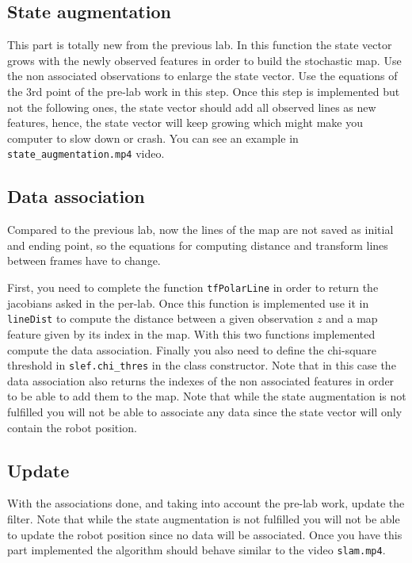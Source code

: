 \documentclass[a4paper,10pt]{article}
\begin{document}
\subsection{State augmentation}
This part is totally new from the previous lab. In this function the state vector grows with the newly observed features in order to build the stochastic map. Use the non associated observations to enlarge the state vector. Use the equations of the 3rd point of the pre-lab work in this step. Once this step is implemented but not the following ones, the state vector should add all observed lines as new features, hence, the state vector will keep growing which might make you computer to slow down or crash. You can see an example in \texttt{state\_augmentation.mp4} video.

\subsection{Data association}
Compared to the previous lab, now the lines of the map are not saved as initial and ending point, so the equations for computing distance and transform lines between frames have to change.

First, you need to complete the function \texttt{tfPolarLine} in order to return the jacobians asked in the per-lab. Once this function is implemented use it in \texttt{lineDist} to compute the distance between a given observation $z$ and a map feature given by its index in the map. With this two functions implemented compute the data association. Finally you also need to define the chi-square threshold in \texttt{slef.chi\_thres} in the class constructor. Note that in this case the data association also returns the indexes of the non associated features in order to be able to add them to the map. Note that while the state augmentation is not fulfilled you will not be able to associate any data since the state vector will only contain the robot position.

\subsection{Update}
With the associations done, and taking into account the pre-lab work, update the filter. Note that while the state augmentation is not fulfilled you will not be able to update the robot position since no data will be associated. Once you have this part implemented the algorithm should behave similar to the video \texttt{slam.mp4}.
\end{document}
